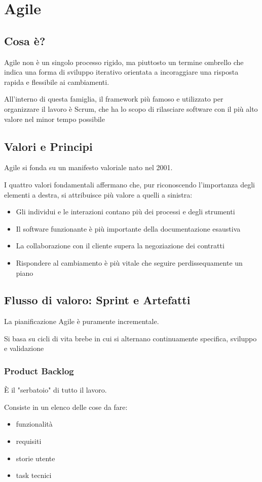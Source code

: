 \chapter{Agile}
\section{Cosa è?}
Agile non è un singolo processo rigido, ma piuttosto un termine ombrello che indica una forma di sviluppo iterativo orientata a incoraggiare una risposta rapida e flessibile ai cambiamenti.

All'interno di questa famiglia, il framework più famoso e utilizzato per organizzare il lavoro è Scrum, che ha lo scopo di rilasciare software con il più alto valore nel minor tempo possibile

\section{Valori e Principi}
Agile si fonda su un manifesto valoriale nato nel 2001.

I quattro valori fondamentali affermano che, pur riconoscendo l'importanza degli elementi a destra, si attribuisce più valore a quelli a sinistra:
\begin{itemize}
    \item Gli individui e le interazioni contano più dei processi e degli strumenti
    \item Il software funzionante è più importante della documentazione esaustiva
    \item La collaborazione con il cliente supera la negoziazione dei contratti
    \item Rispondere al cambiamento è più vitale che seguire perdissequamente un piano
\end{itemize}

\section{Flusso di valoro: Sprint e Artefatti}
La pianificazione Agile è puramente incrementale.

Si basa su cicli di vita brebe in cui si alternano continuamente specifica, sviluppo e validazione

\subsection{Product Backlog}
È il "serbatoio" di tutto il lavoro.

Consiste in un elenco delle cose da fare:
\begin{itemize}
    \item funzionalità
    \item requisiti
    \item storie utente 
    \item task tecnici
\end{itemize}

